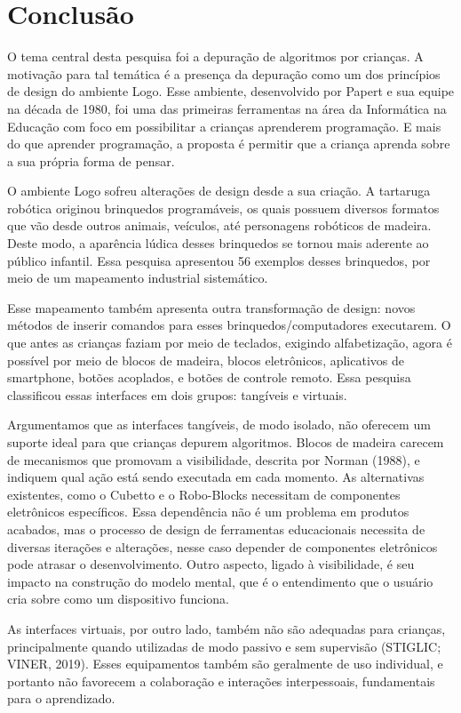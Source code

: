 \chapter{Conclusão}
\label{c_conclusao}

O tema central desta pesquisa foi a depuração de algoritmos por crianças. A motivação para tal temática é a presença da depuração como um dos princípios de design do ambiente Logo. Esse ambiente, desenvolvido por Papert e sua equipe na década de 1980, foi uma das primeiras ferramentas na área da Informática na Educação com foco em possibilitar a crianças aprenderem programação. E mais do que aprender programação, a proposta é permitir que a criança aprenda sobre a sua própria forma de pensar. 

O ambiente Logo sofreu alterações de design desde a sua criação. A tartaruga robótica originou brinquedos programáveis, os quais possuem diversos formatos que vão desde outros animais, veículos, até personagens robóticos de madeira. Deste modo, a aparência lúdica desses brinquedos se tornou mais aderente ao público infantil. Essa pesquisa apresentou 56 exemplos desses brinquedos, por meio de um mapeamento industrial sistemático. 

Esse mapeamento também apresenta outra transformação de design: novos métodos de inserir comandos para esses brinquedos/computadores executarem. O que antes as crianças faziam por meio de teclados, exigindo alfabetização, agora é possível por meio de blocos de madeira, blocos eletrônicos, aplicativos de smartphone, botões acoplados, e botões de controle remoto. Essa pesquisa classificou essas interfaces em dois grupos: tangíveis e virtuais.

Argumentamos que as interfaces tangíveis, de modo isolado, não oferecem um suporte ideal para que crianças depurem algoritmos. Blocos de madeira carecem de mecanismos que promovam a visibilidade, descrita por Norman (1988), e indiquem qual ação está sendo executada em cada momento. As alternativas existentes, como o Cubetto e o Robo-Blocks necessitam de componentes eletrônicos específicos. Essa dependência não é um problema em produtos acabados, mas o processo de design de ferramentas educacionais necessita de diversas iterações e alterações, nesse caso depender de componentes eletrônicos pode atrasar o desenvolvimento. Outro aspecto, ligado à visibilidade, é seu impacto na construção do modelo mental, que é o entendimento que o usuário cria sobre como um dispositivo funciona. 

As interfaces virtuais, por outro lado, também não são adequadas para crianças, principalmente quando utilizadas de modo passivo e sem supervisão (STIGLIC; VINER, 2019). Esses equipamentos também são geralmente de uso individual, e portanto não favorecem a colaboração e interações interpessoais, fundamentais para o aprendizado.

